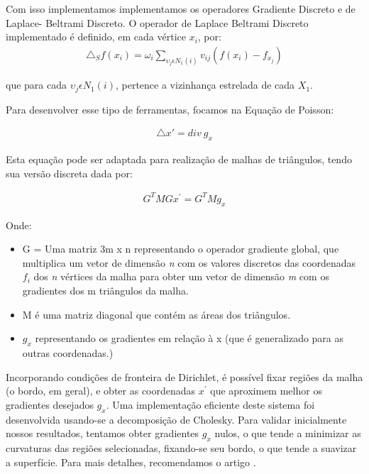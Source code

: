 

Com isso implementamos implementamos os operadores Gradiente Discreto e de Laplace- Beltrami Discreto. O operador de Laplace Beltrami Discreto implementado é definido, em cada vértice $x_i$, por:
\begin{eqnarray}
\triangle_{S}f(x_{i})=\omega_{i} \sum_{\upsilon_{j} \epsilon N_{1}(i) } v_{ij}(f(x_{i}) - f_{x_{j}})
\end{eqnarray}

que para cada $\upsilon_{j} \epsilon N_{1}(i)$, pertence a vizinhança estrelada de cada $X_1$.




Para desenvolver esse tipo de ferramentas, focamos na Equação de Poisson:

\begin{eqnarray}
\bigtriangleup x' = div\  \textbf{$g_x$}
\end{eqnarray}

Esta equação pode ser adaptada para realização de malhas de triângulos, tendo sua versão discreta dada por:

\begin{eqnarray}
G^{T}MGx^{'} = G^{T}Mg_{x}
\end{eqnarray}

Onde:

\begin{itemize}
\item G = Uma matriz 3m x n representando o operador gradiente global, que multiplica um vetor de dimensão \textit{n} com os valores discretos das coordenadas $f_i$ dos \textit{n} vértices da malha para obter um vetor de dimensão \textit{m} com os gradientes dos m triângulos da malha.
\item M é uma matriz diagonal que contém as áreas dos triângulos.
\item $g_x$ representando os gradientes em relação à x (que é generalizado para as outras coordenadas.) 
\end{itemize}
Incorporando condições de fronteira de Dirichlet, é possível fixar regiões da malha (o bordo, em geral), e obter as coordenadas $x^{'}$  que aproximem melhor os gradientes desejados $g_x$. 
Uma implementação eficiente deste sistema foi desenvolvida usando-se a decomposição de Cholesky. Para validar inicialmente nossos resultados, tentamos obter gradientes $g_x$ nulos, o que tende a minimizar as curvaturas das regiões selecionadas, fixando-se seu bordo, o que tende a suavizar a superfície. Para mais detalhes, recomendamos o artigo \cite{Olga}.















